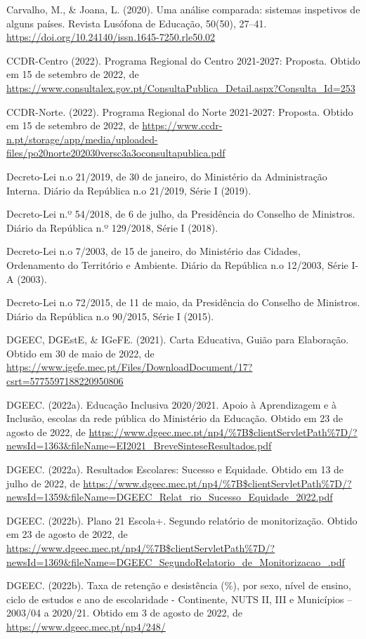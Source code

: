 \documentclass[
]{book}
\begin{document}
Carvalho, M., \& Joana, L. (2020). Uma análise comparada: sistemas inspetivos de alguns países. Revista Lusófona de Educação, 50(50), 27--41. \url{https://doi.org/10.24140/issn.1645-7250.rle50.02}

CCDR-Centro (2022). Programa Regional do Centro 2021-2027: Proposta. Obtido em 15 de setembro de 2022, de \url{https://www.consultalex.gov.pt/ConsultaPublica_Detail.aspx?Consulta_Id=253}

CCDR-Norte. (2022). Programa Regional do Norte 2021-2027: Proposta. Obtido em 15 de setembro de 2022, de \url{https://www.ccdr-n.pt/storage/app/media/uploaded-files/po20norte202030versc3a3oconsultapublica.pdf}

Decreto-Lei n.o 21/2019, de 30 de janeiro, do Ministério da Administração Interna. Diário da República n.o 21/2019, Série I (2019).

Decreto-Lei n.º 54/2018, de 6 de julho, da Presidência do Conselho de Ministros. Diário da República n.º 129/2018, Série I (2018).

Decreto-Lei n.o 7/2003, de 15 de janeiro, do Ministério das Cidades, Ordenamento do Território e Ambiente. Diário da República n.o 12/2003, Série I-A (2003).

Decreto-Lei n.o 72/2015, de 11 de maio, da Presidência do Conselho de Ministros. Diário da República n.o 90/2015, Série I (2015).

DGEEC, DGEstE, \& IGeFE. (2021). Carta Educativa, Guião para Elaboração. Obtido em 30 de maio de 2022, de \url{https://www.igefe.mec.pt/Files/DownloadDocument/17?csrt=5775597188220950806}

DGEEC. (2022a). Educação Inclusiva 2020/2021. Apoio à Aprendizagem e à Inclusão, escolas da rede pública do Ministério da Educação. Obtido em 23 de agosto de 2022, de \url{https://www.dgeec.mec.pt/np4/\%7B$clientServletPath\%7D/?newsId=1363\&fileName=EI2021_BreveSinteseResultados.pdf}

DGEEC. (2022a). Resultados Escolares: Sucesso e Equidade. Obtido em 13 de julho de 2022, de \url{https://www.dgeec.mec.pt/np4/\%7B$clientServletPath\%7D/?newsId=1359\&fileName=DGEEC_Relat_rio_Sucesso_Equidade_2022.pdf}

DGEEC. (2022b). Plano 21 Escola+. Segundo relatório de monitorização. Obtido em 23 de agosto de 2022, de \url{https://www.dgeec.mec.pt/np4/\%7B$clientServletPath\%7D/?newsId=1369\&fileName=DGEEC_SegundoRelatorio_de_Monitorizacao_.pdf}

DGEEC. (2022b). Taxa de retenção e desistência (\%), por sexo, nível de ensino, ciclo de estudos e ano de escolaridade - Continente, NUTS II, III e Municípios -- 2003/04 a 2020/21. Obtido em 3 de agosto de 2022, de \url{https://www.dgeec.mec.pt/np4/248/}
\end{document}
